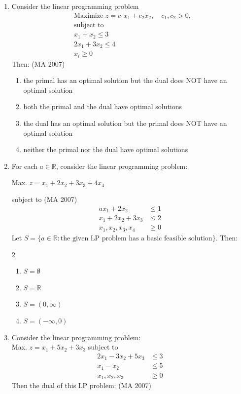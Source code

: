 \begin{enumerate}[label=\thesubsection.\arabic*,ref=\thesubsection.\theenumi]
\item Consider the linear programming problem
\begin{align*}
& \text{Maximize } z = c_1 x_1 + c_2 x_2, \quad c_1, c_2 > 0, \\
& \text{subject to} \\
& x_1 + x_2 \le 3 \\
& 2x_1 + 3x_2 \le 4 \\
& x_i \ge 0
\end{align*}
Then:
\hfill (MA 2007)
\begin{enumerate}
\item  the primal has an optimal solution but the dual does NOT have an optimal solution
\item  both the primal and the dual have optimal solutions
\item the dual has an optimal solution but the primal does NOT have an optimal solution
\item neither the primal nor the dual have optimal solutions
\end{enumerate}
\item For each $a \in \mathbb{R}$, consider the linear programming problem:
 
   \begin{flushleft}
    \hspace{3cm} Max. $z = x_1 + 2x_2 + 3x_3 + 4x_4$
   \end{flushleft}
    \hspace{3cm} subject to \hfill (MA 2007)
    \begin{align*}
        ax_1 + 2x_2 &\leq 1 \\
        x_1 + 2x_2 + 3x_3 &\leq 2 \\
        x_1, x_2, x_3, x_4 &\geq 0
    \end{align*}
    Let $S = \{a \in \mathbb{R} : \text{the given LP problem has a basic feasible solution}\}$. Then:
    \begin{multicols}{2}
    \begin{enumerate}
        \item $S = \emptyset$
        \item $S = \mathbb{R}$
        \item $S = (0, \infty)$
        \item $S = (-\infty, 0)$
    \end{enumerate}
    \end{multicols}
    


\item Consider the linear programming problem:\\
   \hspace{3cm} Max. $z = x_1 + 5x_2 + 3x_3$
   \hspace{3cm} subject to
    \begin{align*}
        2x_1 - 3x_2 + 5x_3 &\leq 3 \\
        x_1 - x_2 &\leq 5 \\
        x_1, x_2, x_3 &\geq 0
    \end{align*}
    Then the dual of this LP problem:
     \hfill (MA 2007)
    

\end{enumerate}
